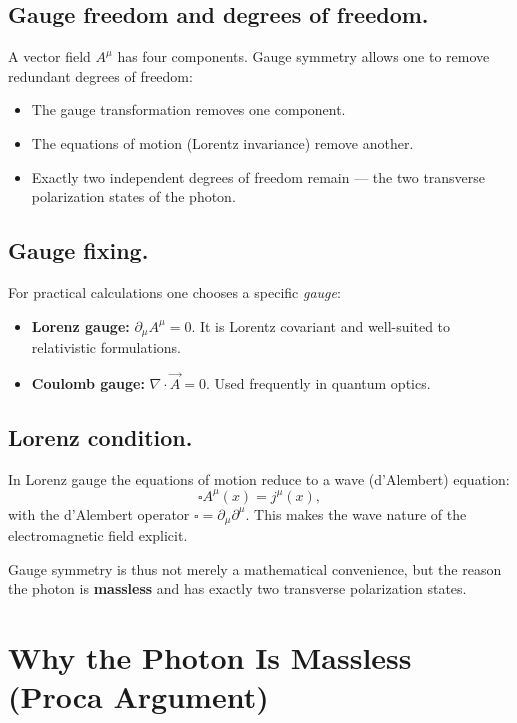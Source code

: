 \subsection*{Gauge freedom and degrees of freedom.}
A vector field \( A^\mu \) has four components.  
Gauge symmetry allows one to remove redundant degrees of freedom:
\begin{itemize}
	\item The gauge transformation removes one component.
	\item The equations of motion (Lorentz invariance) remove another.
	\item Exactly two independent degrees of freedom remain — 
	the two transverse polarization states of the photon.
\end{itemize}

\subsection*{Gauge fixing.}
For practical calculations one chooses a specific \emph{gauge}:
\begin{itemize}
	\item \textbf{Lorenz gauge:} 
	\(\partial_\mu A^\mu = 0\).  
	It is Lorentz covariant and well-suited to relativistic formulations.
	\item \textbf{Coulomb gauge:} 
	\(\nabla \cdot \vec{A} = 0\).  
	Used frequently in quantum optics.
\end{itemize}

\subsection*{Lorenz condition.}
In Lorenz gauge the equations of motion reduce to a wave (d’Alembert) equation:
\[
\square A^\mu(x) = j^\mu(x),
\]
with the d’Alembert operator \(\square = \partial_\mu \partial^\mu\).
This makes the wave nature of the electromagnetic field explicit.

\medskip
Gauge symmetry is thus not merely a mathematical convenience, 
but the reason the photon is \textbf{massless} and has exactly two transverse polarization states.
\newpage
\noindent
\section{Why the Photon Is Massless \newline (Proca Argument)}
\label{anhangA:masselosigkeit_proca}

